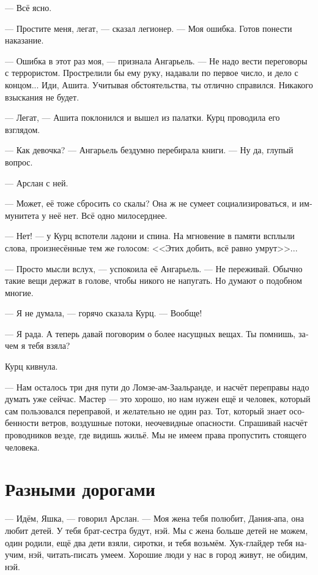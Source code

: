 \documentclass[a4paper,12pt,fleqn]{book}\usepackage{polyglossia}\setdefaultlanguage[babelshorthands=true]{russian}\setotherlanguage{english}\defaultfontfeatures{Ligatures=TeX,Mapping=tex-text}\usepackage{xcolor}\newcommand{\ml}[3]{#2}
\begin{document}
--- Всё ясно.

--- Простите меня, легат, --- сказал легионер.
--- Моя ошибка.
Готов понести наказание.

--- Ошибка в этот раз моя, --- признала Ангарьель.
--- Не надо вести переговоры с террористом.
Прострелили бы ему руку, надавали по первое число, и дело с концом...
Иди, Ашита.
Учитывая обстоятельства, ты отлично справился.
Никакого взыскания не будет.

--- Легат, --- Ашита поклонился и вышел из палатки.
Курц проводила его взглядом.

--- Как девочка? --- Ангарьель бездумно перебирала книги.
--- Ну да, глупый вопрос.

--- Арслан с ней.

--- Может, её тоже сбросить со скалы?
Она ж не сумеет социализироваться, и иммунитета у неё нет.
Всё одно милосерднее.

--- Нет! --- у Курц вспотели ладони и спина.
На мгновение в памяти всплыли слова, произнесённые тем же голосом:
<<Этих добить, всё равно умрут>>...

--- Просто мысли вслух, --- успокоила её Ангарьель.
--- Не переживай.
Обычно такие вещи держат в голове, чтобы никого не напугать.
Но думают о подобном многие.

--- Я не думала, --- горячо сказала Курц.
--- Вообще!

--- Я рада.
А теперь давай поговорим о более насущных вещах.
Ты помнишь, зачем я тебя взяла?

Курц кивнула.

--- Нам осталось три дня пути до Ломзе-ам-Заальранде, и насчёт переправы надо думать уже сейчас.
Мастер --- это хорошо, но нам нужен ещё и человек, который сам пользовался переправой, и желательно не один раз.
Тот, который знает особенности ветров, воздушные потоки, неочевидные опасности.
Спрашивай насчёт проводников везде, где видишь жильё.
Мы не имеем права пропустить стоящего человека.

\section{Разными дорогами}

--- Идём, Яшка, --- говорил Арслан.
--- Моя жена тебя полюбит, Дания-апа, она любит детей.
У тебя брат-сестра будут, нэй.
Мы с жена больше детей не можем, один родили, ещё два дети взяли, сиротки, и тебя возьмём.
Хук-глайдер тебя научим, нэй, читать-писать умеем.
Хорошие люди у нас в город живут, не обидим, нэй.
\end{document}
